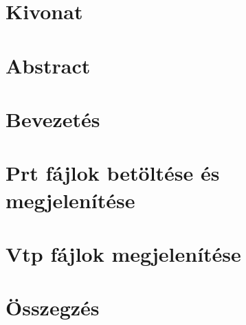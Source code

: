 \documentclass[11pt,a4paper,oneside]{report}
\begin{document}


\pagestyle{empty}
\tableofcontents



\chapter*{Kivonat}


\chapter*{Abstract}


\pagestyle{fancy}
\renewcommand{\chaptermark}[1]{\markboth{#1}{}}
\chapter{Bevezetés}


\chapter{Prt fájlok betöltése és megjelenítése}


\chapter{Vtp fájlok megjelenítése}


\chapter{Összegzés}


\renewcommand{\bibname}{Irodalomjegyzék}
\nocite{*}
\clearpage
{}
{}
\printbibliography

\pagestyle{empty}

\clearpage
{}
{}
\listoffigures
\end{document}

